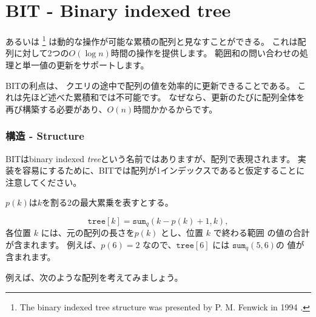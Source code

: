 \section{BIT - Binary indexed tree}


 あるいは \footnote{The
binary indexed tree structure was presented by P. M. Fenwick in 1994 \cite{fen94}.}
は動的な操作が可能な累積の配列と見なすことができる。
これは配列に対して2つの$O(\log n)$時間の操作を提供します。
範囲和の問い合わせの処理と単一値の更新をサポートします。

BITの利点は、
クエリの途中で配列の値を効率的に更新できることである。
これは先ほど述べた累積和では不可能です。
なぜなら、更新のたびに配列全体を再び構築する必要があり、$O(n)$時間かかるからです。

\subsubsection{構造 - Structure}

BITはbinary indexed \emph{tree}という名前ではありますが、配列で表現されます。
実装を容易にするために、BITでは配列が1インデックスであると仮定することに注意してください。

$p(k)$は$k$を割る2の最大累乗を表すとする。

\[ \texttt{tree}[k] = \texttt{sum}_q(k-p(k)+1,k),\]
各位置 $k$ には、元の配列の長さを$p(k)$ とし、位置 $k$ で終わる範囲 の値の合計が含まれます。
例えば、$p(6) = 2$ なので、$\texttt{tree}[6]$ には 
$\texttt{sum}_q(5,6)$の 値が含まれます。

例えば、次のような配列を考えてみましょう。
\begin{center}
\end{center}

